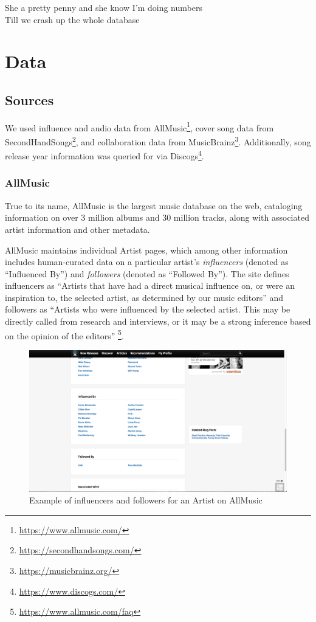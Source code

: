 \begin{savequote}[75mm] 
She a pretty penny and she know I'm doing numbers\\
Till we crash up the whole database
\end{savequote}

\chapter{Data}

\section{Sources}
We used influence and audio data from AllMusic\footnote{\url{https://www.allmusic.com/}}, cover song data from SecondHandSongs\footnote{\url{https://secondhandsongs.com/}}, and collaboration data from MusicBrainz\footnote{\url{https://musicbrainz.org/}}. Additionally, song release year information was queried for via Discogs\footnote{\url{https://www.discogs.com/}}.

\subsection{AllMusic}
True to its name, AllMusic is the largest music database on the web, cataloging information on over 3 million albums and 30 million tracks, along with associated artist information and other metadata.

AllMusic maintains individual Artist pages, which among other information includes human-curated data on a particular artist's \textit{influencers} (denoted as ``Influenced By'') and \textit{followers} (denoted as ``Followed By''). The site defines influencers as ``Artists that have had a direct musical influence on, or were an inspiration to, the selected artist, as determined by our music editors'' and followers as ``Artists who were influenced by the selected artist. This may be directly called  from research and interviews, or it may be a strong inference based on the opinion of the editors'' \footnote{\url{https://www.allmusic.com/faq}}.

\begin{figure}[H]
\includegraphics[width=\textwidth]{figures/allmusic_influences.png}
\caption{Example of influencers and followers for an Artist on AllMusic}
\end{figure}

